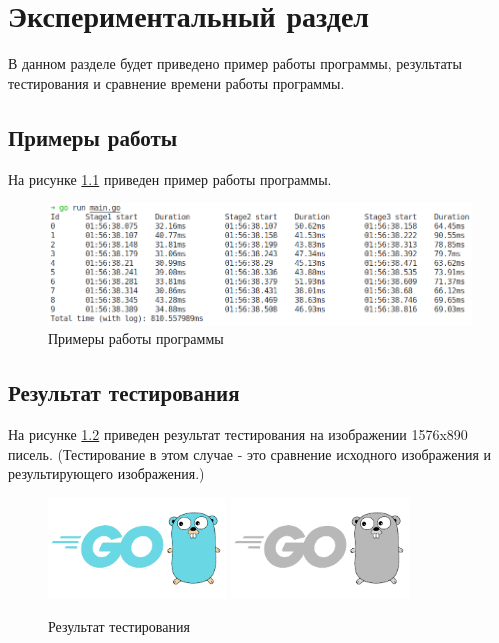 \chapter{Экспериментальный раздел}
\label{cha:research}

В данном разделе будет приведено пример работы программы,
результаты тестирования и сравнение времени работы программы.

\section{Примеры работы}
На рисунке \ref{fig:4.1} приведен пример работы программы.

\begin{figure}[h]
    \centering
    \includegraphics[width=1\textwidth]{5/inc/e1.png}
    \caption{Примеры работы программы}
    \label{fig:4.1}
\end{figure}


\section{Результат тестирования}

На рисунке \ref{fig:4.2} приведен результат тестирования на изображении 1576x890 писель.
(Тестирование в этом случае - это сравнение исходного изображения и результирующего изображения.)

\begin{figure}[h]
    \centering
    \includegraphics[width=0.42\textwidth]{5/inc/e2.png}
    \includegraphics[width=0.42\textwidth]{5/inc/e3.png}
    \caption{Результат тестирования}
    \label{fig:4.2}
\end{figure}


